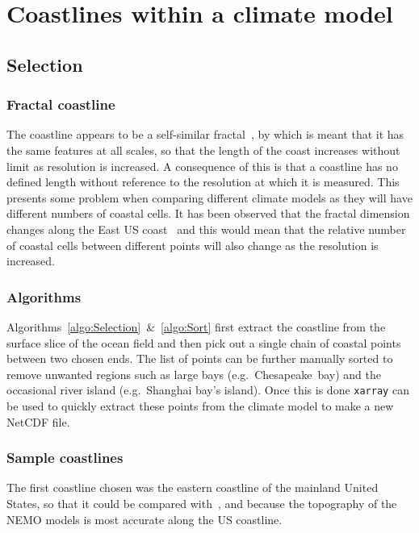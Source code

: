\section{Coastlines within a climate model}
\label{sec:coast}
\subsection{Selection}
 \subsubsection{Fractal coastline}
 \label{sec:fractal}
 The coastline appears to be a self-similar fractal~\cite{mandelbrot1967long,
 richardson1961problem}, by which is meant that it has the same features at all
 scales, so that the length of the coast increases without limit as resolution
 is increased.
 A consequence of this is that a coastline has no defined length without
 reference to the resolution at which it is measured.
 This presents some problem when comparing different climate models as they will have different
 numbers of coastal cells. It has been observed that the fractal dimension changes
  along the East US coast~\cite{jiang1998fractal}
 and this would mean that the relative number of coastal cells between different
 points will also change as the resolution is increased.

\subsubsection{Algorithms}
\label{sec:coast-algorithms}
Algorithms~\ref{algo:Selection}~\&~\ref{algo:Sort} first extract the coastline
from the surface slice of the ocean field and then pick out a single chain of
coastal points between two chosen ends. The list of points can be further
manually sorted to remove unwanted regions such as large bays (e.g.~Chesapeake~bay)
and the occasional river island (e.g.~Shanghai bay's island). Once this is
done \texttt{xarray} can be used to quickly extract these points
from the climate model to make a new NetCDF file.





\subsubsection{Sample coastlines}
The first coastline chosen was the eastern coastline of the mainland
United States, so that it could be compared with~\cite{ZannaPreprint},
and because the topography of the NEMO models is most accurate along the
US coastline.

